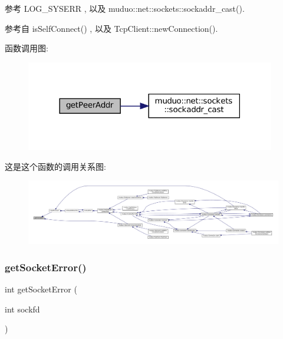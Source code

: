 参考 L\+O\+G\+\_\+\+S\+Y\+S\+E\+RR , 以及 muduo\+::net\+::sockets\+::sockaddr\+\_\+cast().



参考自 is\+Self\+Connect() , 以及 Tcp\+Client\+::new\+Connection().

函数调用图\+:
\nopagebreak
\begin{figure}[H]
\begin{center}
\leavevmode
\includegraphics[width=309pt]{namespacemuduo_1_1sockets_ad095a2bf0c44507c945d04f8346f2817_cgraph}
\end{center}
\end{figure}
这是这个函数的调用关系图\+:
\nopagebreak
\begin{figure}[H]
\begin{center}
\leavevmode
\includegraphics[width=350pt]{namespacemuduo_1_1sockets_ad095a2bf0c44507c945d04f8346f2817_icgraph}
\end{center}
\end{figure}
\mbox{\label{namespacemuduo_1_1sockets_a80bd626331e049209f59d11c80a8b539}} 
\subsubsection{\texorpdfstring{get\+Socket\+Error()}{getSocketError()}}
{\footnotesize\ttfamily int get\+Socket\+Error (\begin{DoxyParamCaption}\item[{int}]{sockfd }\end{DoxyParamCaption})}



